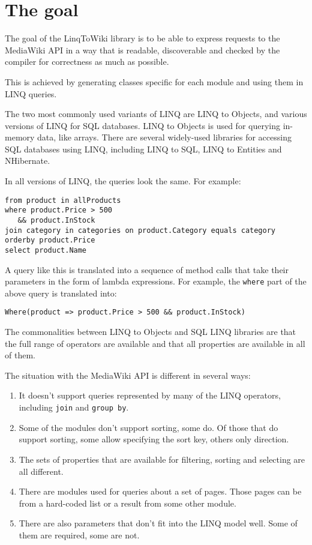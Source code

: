 \chapter{The goal}

The goal of the LinqToWiki library is to be able to express requests to the MediaWiki API
in a way that is readable, discoverable and checked by the compiler for correctness as much as possible.

This is achieved by generating classes specific for each module and using them in LINQ queries.

The two most commonly used variants of LINQ are LINQ to Objects, and various versions of LINQ for SQL databases.
LINQ to Objects is used for querying in-memory data, like arrays.
There are several widely-used libraries for accessing SQL databases using LINQ, including LINQ to SQL, LINQ to Entities and NHibernate.

In all versions of LINQ, the queries look the same. For example:

\begin{lstlisting}
from product in allProducts
where product.Price > 500
   && product.InStock
join category in categories on product.Category equals category
orderby product.Price
select product.Name
\end{lstlisting}

A query like this is translated into a sequence of method calls that take their parameters in the form of lambda expressions.
For example, the \lstinline{where} part of the above query is translated into:

\begin{lstlisting}
Where(product => product.Price > 500 && product.InStock)
\end{lstlisting}

The commonalities between LINQ to Objects and SQL LINQ libraries are that the full range of operators are available
and that all properties are available in all of them.

The situation with the MediaWiki API is different in several ways:

\begin{enumerate}
\item It doesn't support queries represented by many of the LINQ operators, including \lstinline{join} and \lstinline{group by}.
\item Some of the modules don't support sorting, some do. Of those that do support sorting, some allow specifying the sort key, others only direction.
\item The sets of properties that are available for filtering, sorting and selecting are all different.
\item There are modules used for queries about a set of pages. Those pages can be from a hard-coded list or a result from some other module.
\item There are also parameters that don't fit into the LINQ model well. Some of them are required, some are not.
\end{enumerate}

